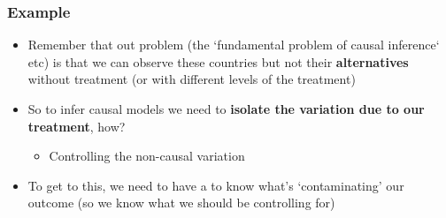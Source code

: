 \documentclass[aspectratio=43]{beamer}
\begin{document}
\begin{frame}
\frametitle{Example}
\centering

\begin{itemize}
  \item Remember that out problem (the `fundamental problem of causal inference` etc) is that we can observe these countries but not their \textbf{alternatives} without treatment (or with different levels of the treatment)
  \item So to infer causal models we need to \textbf{isolate the variation due to our treatment}, how?
  \begin{itemize}
    \item Controlling the non-causal variation
  \end{itemize}
  \item To get to this, we need to have a  to know what's `contaminating' our outcome (so we know what we should be controlling for)
\end{itemize}

\end{frame}
\end{document}
